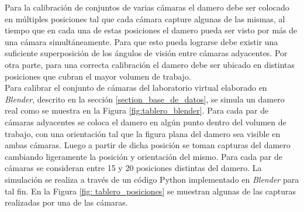 Para la calibración de conjuntos de varias cámaras el damero debe ser colocado en múltiples posiciones tal que cada cámara capture algunas de las mismas, al tiempo que en cada una de estas posiciones el damero pueda ser visto por más de una cámara simultáneamente. Para que esto pueda lograrse debe existir una suficiente superposición de los ángulos de visión entre cámaras adyacentes. Por otra parte, para una correcta calibración el damero debe ser ubicado en distintas posiciones que cubran el mayor volumen de trabajo.\\

Para calibrar el conjunto de cámaras del laboratorio virtual elaborado en \emph{Blender}, descrito en la sección \ref{section_base_de_datos}, se simula un damero real como se muestra en la Figura \ref{fig:tablero_blender}. Para cada par de cámaras adyacentes se coloca el damero en algún punto dentro del volumen de trabajo, con una orientación tal que la figura plana del damero sea visible en ambas cámaras. Luego a partir de dicha posición se toman capturas del damero cambiando ligeramente la posición y orientación del mismo. Para cada par de cámaras se consideran entre 15 y 20 posiciones distintas del damero. La simulación se realiza a través de un código Python implementado en \emph{Blender} para tal fin. En la Figura \ref{fig: tablero_posiciones} se muestran algunas de las capturas realizadas por una de las cámaras. 




